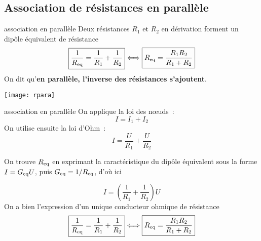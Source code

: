 \documentclass[../main/main.tex]{subfiles}
\begin{document}
\subsection{Association de résistances en parallèle}
\begin{tcbraster}[raster columns=2, raster equal height=rows]
    \begin{prop}[label=prop:rpara]{association en parallèle}
        Deux résistances $R_1$ et $R_2$ en dérivation forment un dipôle
        équivalent de résistance
        \[ \boxed{\dfrac{1}{R_{\rm eq}} = \dfrac{1}{R_1} + \dfrac{1}{R_2}}
        \Longleftrightarrow \boxed{R_{\rm eq} = \frac{R_1R_2}{R_1 + R_2}}\]
        On dit qu'\textbf{en parallèle, l'inverse des résistances s'ajoutent}.
        \tcblower
        \begin{center}
            \texttt{[image: rpara]}
        \end{center}
    \end{prop}
    \begin{demo}[label=demo:rpara]{association en parallèle}
        On applique la loi des nœuds~: \[I = I_1+I_2\]
        On utilise ensuite la loi d'Ohm~:
        \[I = \frac{U}{R_1} + \frac{U}{R_2}\]

        On trouve $R_{\rm eq}$ en exprimant la caractéristique du dipôle
        équivalent sous la forme $I = G_{\rm eq}U$, puis $G_{\rm eq} = 1/R_{\rm
        eq}$, d'où ici

        \[I = \left(\dfrac{1}{R_1} + \dfrac{1}{R_2}\right) U\]
        On a bien l'expression d'un unique conducteur ohmique de résistance
        \[\boxed{\dfrac{1}{R_{\rm eq}} = \dfrac{1}{R_1} + \dfrac{1}{R_2}}
        \Longleftrightarrow \boxed{R_{\rm eq} = \frac{R_1R_2}{R_1 + R_2}}\]
    \end{demo}
\end{tcbraster}
\end{document}
